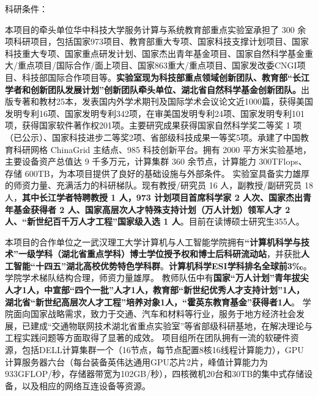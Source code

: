 {\kaishu
科研条件：

本项目的牵头单位华中科技大学服务计算与系统教育部重点实验室承担了 300 余项科研项目，包括国家973项目、教育部重大专项、国家科技支撑计划项目、国家科技重大专项、国家重点研发计划、国家杰出青年基金项目、国家自然科学基金重大/重点项目/国际合作/面上项目、国家863重大/重点项目、国家发改委CNGI项目、科技部国际合作项目等。\textbf{实验室现为科技部重点领域创新团队、教育部“长江学者和创新团队发展计划”创新团队牵头单位、湖北省自然科学基金创新团队。}出版专著和教材25本，发表国内外学术期刊及国际学术会议论文近1000篇，获得美国发明专利16项、国家发明专利342项，在审美国发明专利24项、国家发明专利101项，获得国家软件著作权201项。主要研究成果获得国家自然科学奖二等奖 1 项（已公示）、国家科技进步二等奖2项、省部级科技成果一等奖5项。承建了中国教育科研网格 ChinaGrid 主结点、985 科技创新平台。拥有 2000 平方米实验基地，主要设备资产总值达 9 千多万元，计算集群 360 余节点，计算能力 300TFlops、存储 600TB，为本项目提供了良好的基础设施与外部条件。
实验室具备实力雄厚的师资力量、充满活力的科研梯队。现有教授/研究员 16 人，副教授/副研究员 18 人，\textbf{其中长江学者特聘教授 1 人，973 计划项目首席科学家 2 人次、国家杰出青年基金获得者 2 人、国家高层次人才特殊支持计划（万人计划）领军人才 2 人、“新世纪百千万人才工程”国家级入选 1 人}。目前在读博硕士研究生355人。

本项目的合作单位之一武汉理工大学计算机与人工智能学院拥有\textbf{“计算机科学与技术”一级学科（湖北省重点学科）博士学位授予权和博士后科研流动站}，并获批\textbf{人工智能“十四五”湖北高校优势特色学科群}。\textbf{计算机科学ESI学科排名全球前3‰}。
学院学术梯队结构合理，师资力量雄厚。
教师队伍中有\textbf{国家“万人计划”青年拔尖人才1人，中宣部“四个一批”人才1人，教育部“新世纪优秀人才支持计划”1人，湖北省“新世纪高层次人才工程”培养对象1人，“霍英东教育基金”获得者1人}。
学院面向国家战略需求，致力于交通、汽车和材料等行业，服务于地方经济社会发展，已建成“交通物联网技术湖北省重点实验室”等省部级科研基地，在解决理论与工程实践问题等方面取得了显著的成效。
项目组所在团队拥有一流的软硬件资源，包括DELL计算集群一个（16节点，每节点配置8核16线程计算能力），GPU 计算服务器六台（每台装备英伟达通用GPU芯片2片，峰值计算能力为933GFLOP/秒，存储器带宽为102GB/秒），四核微机20台和30TB的集中式存储设备，以及相应的网络互连设备等资源。

}
